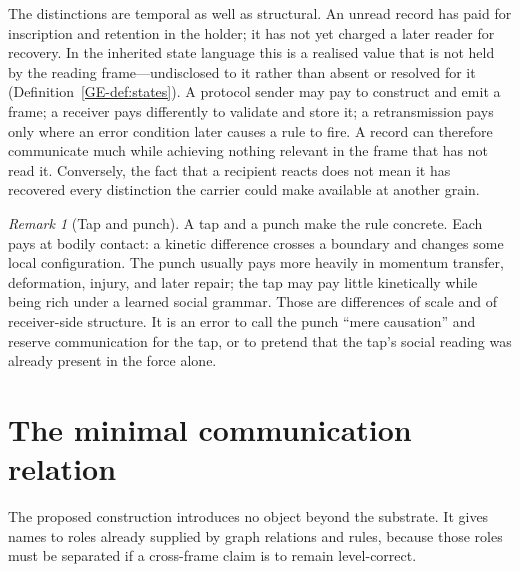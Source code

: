 \documentclass[11pt,a4paper]{article}
\theoremstyle{remark}\newtheorem{remark}[definition]{Remark}
\begin{document}
The distinctions are temporal as well as structural. An unread record has paid
for inscription and retention in the holder; it has not yet charged a later
reader for recovery. In the inherited state language this is a realised value that
is not held by the reading frame---undisclosed to it rather than absent or
resolved for it (Definition~\ref{GE-def:states}). A protocol sender may pay to construct and emit a frame; a
receiver pays differently to validate and store it; a retransmission pays only
where an error condition later causes a rule to fire. A record can therefore
communicate much while achieving nothing relevant in the frame that has not read
it. Conversely, the fact that a recipient reacts does not mean it has recovered
every distinction the carrier could make available at another grain.

\begin{remark}[Tap and punch]\label{rem:tap-punch}
A tap and a punch make the rule concrete. Each pays at bodily contact: a kinetic
difference crosses a boundary and changes some local configuration. The punch
usually pays more heavily in momentum transfer, deformation, injury, and later
repair; the tap may pay little kinetically while being rich under a learned social
grammar. Those are differences of scale and of receiver-side structure. It is an
error to call the punch ``mere causation'' and reserve communication for the tap,
or to pretend that the tap's social reading was already present in the force alone.
\end{remark}

\section{The minimal communication relation}\label{sec:minimal-relation}

The proposed construction introduces no object beyond the substrate. It gives
names to roles already supplied by graph relations and rules, because those roles
must be separated if a cross-frame claim is to remain level-correct.
\end{document}
